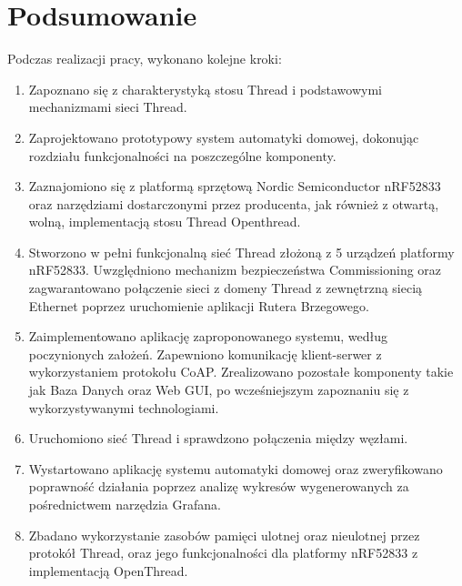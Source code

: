 \chapter*{Podsumowanie}

Podczas realizacji pracy, wykonano kolejne kroki:
\begin{enumerate}
    \item Zapoznano się z charakterystyką stosu Thread i podstawowymi mechanizmami sieci Thread.
    \item Zaprojektowano prototypowy system automatyki domowej, dokonując rozdziału funkcjonalności na poszczególne komponenty.
    \item Zaznajomiono się z platformą sprzętową Nordic Semiconductor nRF52833 oraz narzędziami dostarczonymi przez producenta, jak również z otwartą, wolną, implementacją stosu Thread Openthread.
    \item Stworzono w pełni funkcjonalną sieć Thread złożoną z 5 urządzeń platformy nRF52833. Uwzględniono mechanizm bezpieczeństwa Commissioning oraz zagwarantowano połączenie sieci z domeny Thread z zewnętrzną siecią Ethernet poprzez uruchomienie aplikacji Rutera Brzegowego.
    \item Zaimplementowano aplikację zaproponowanego systemu, według poczynionych założeń. Zapewniono komunikację klient-serwer z wykorzystaniem protokołu CoAP. Zrealizowano pozostałe komponenty takie jak Baza Danych oraz Web GUI, po wcześniejszym zapoznaniu się z wykorzystywanymi technologiami.
    \item Uruchomiono sieć Thread i sprawdzono połączenia między węzłami.
    \item Wystartowano aplikację systemu automatyki domowej oraz zweryfikowano poprawność działania poprzez analizę wykresów wygenerowanych za pośrednictwem narzędzia Grafana.
    \item Zbadano wykorzystanie zasobów pamięci ulotnej oraz nieulotnej przez protokół Thread, oraz jego funkcjonalności dla platformy nRF52833 z implementacją OpenThread.
\end{enumerate}

